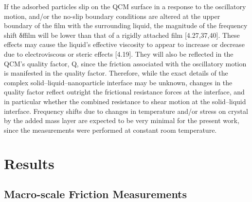 If the adsorbed particles slip on the QCM surface in a response to the oscillatory motion, and/or the no-slip boundary conditions are altered at the upper boundary of the film with the surrounding liquid, the magnitude of the frequency shift δffilm will be lower than that of a rigidly attached film [4.27,37,40]. These effects may cause the liquid’s effective viscosity to appear to increase or decrease due to electroviscous or steric effects [4.19]. They will also be reflected in the QCM’s quality factor, Q, since the friction associated with the oscillatory motion is manifested in the quality factor. Therefore, while the exact details of the complex solid–liquid–nanoparticle interface may be unknown, changes in the quality factor reflect outright the frictional resistance forces at the interface, and in particular whether the combined resistance to shear motion at the solid–liquid interface. Frequency shifts due to changes in temperature and/or stress on crystal by the added mass layer are expected to be very minimal for the present work, since the measurements were performed at constant room temperature.

\section{Results}

\subsection{Macro-scale Friction Measurements}

